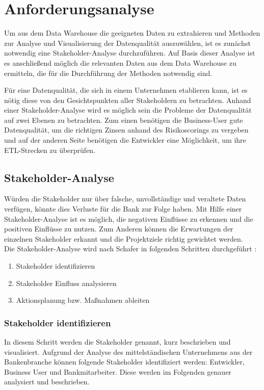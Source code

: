 \chapter{Anforderungsanalyse}\label{ch:anforderungen}
Um aus dem Data Warehouse die geeigneten Daten zu extrahieren und Methoden zur Analyse und Visualisierung der Datenqualität auszuwählen, ist es zunächst notwendig eine Stakeholder-Analyse durchzuführen. 
Auf Basis dieser Analyse ist es anschließend möglich die relevanten Daten aus dem Data Warehouse zu ermitteln, die für die Durchführung der Methoden notwendig sind. 



Für eine Datenqualität, die sich in einem Unternehmen etablieren kann, ist es nötig diese von den Gesichtspunkten aller Stakeholdern zu betrachten.
Anhand einer Stakeholder-Analyse wird es möglich sein die Probleme der Datenqualität auf zwei Ebenen zu betrachten. 
Zum einen benötigen die Business-User gute Datenqualität, um die richtigen Zinsen anhand des Risikoscorings zu vergeben und auf der anderen Seite benötigen die Entwickler eine Möglichkeit, um ihre ETL-Strecken zu überprüfen.




\section{Stakeholder-Analyse}
\label{sec:Stakeholder-Analyse} 
Würden die Stakeholder nur über falsche, unvollständige und veraltete Daten verfügen, könnte dies Verluste für die Bank zur Folge haben.
Mit Hilfe einer Stakeholder-Analyse ist es möglich, die negativen Einflüsse zu erkennen und die positiven Einflüsse zu nutzen.
Zum Anderen können die Erwartungen der einzelnen Stakeholder erkannt und die Projektziele richtig gewichtet werden. \\
Die Stakeholder-Analyse wird nach Schafer in folgenden Schritten durchgeführt \cite{schafer2009}: 

\begin{enumerate}
 \item Stakeholder identifizieren
 \item Stakeholder Einfluss analysieren
 \item Aktionsplanung bzw. Maßnahmen ableiten
\end{enumerate} 

\subsection{Stakeholder identifizieren}
In diesem Schritt werden die Stakeholder genannt, kurz beschrieben und visualisiert. 
Aufgrund der Analyse des mittelständischen Unternehmens aus der Bankenbranche können folgende Stakeholder identifiziert werden: Entwickler, Business User und Bankmitarbeiter.
Diese werden im Folgenden genauer analysiert und beschrieben. 


